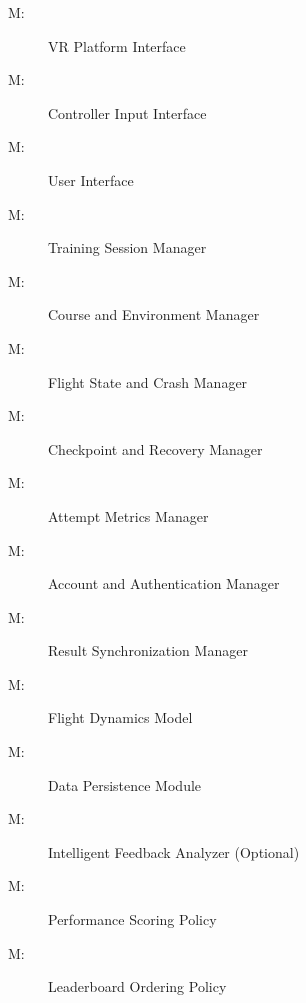 \documentclass[12pt, titlepage]{article}
\newcounter{mnum}
\newcommand{\mthemnum}{M\themnum}
\begin{document}
\begin{description}

\item[ \mthemnum \label{mXR}:]
VR Platform Interface

\item[ \mthemnum \label{mController}:]
Controller Input Interface

\item[ \mthemnum \label{mUI}:]
User Interface

\item[ \mthemnum \label{mTraining}:]
Training Session Manager

\item[ \mthemnum \label{mEnvironment}:]
Course and Environment Manager

\item[ \mthemnum \label{mFlightState}:]
Flight State and Crash Manager

\item[ \mthemnum \label{mCheckpoint}:]
Checkpoint and Recovery Manager

\item[ \mthemnum \label{mPerformance}:]
Attempt Metrics Manager

\item[ \mthemnum \label{mAccount}:]
Account and Authentication Manager

\item[ \mthemnum \label{mLeaderboard}:]
Result Synchronization Manager

\item[ \mthemnum \label{mPhysics}:]
Flight Dynamics Model

\item[ \mthemnum \label{mStorage}:]
Data Persistence Module

\item[ \mthemnum \label{mAI}:]
Intelligent Feedback Analyzer (Optional)

\item[ \mthemnum \label{mScoring}:]
Performance Scoring Policy

\item[ \mthemnum \label{mRanking}:]
Leaderboard Ordering Policy

\end{description}
\end{document}
